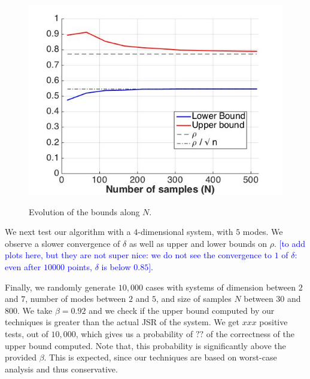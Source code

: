 \begin{figure}
\begin{center}
\includegraphics[scale=0.35]{bounds1.jpg}
\label{fig:2}
\caption{Evolution of the bounds along $N$.}
\end{center}
\end{figure}

We next test our algorithm with a $4$-dimensional system, with $5$ modes. We observe a slower convergence of $\delta$ as well as upper and lower bounds on $\rho$.
\textcolor{blue}{[to add plots here, but they are not super nice: we do not see the convergence to $1$ of $\delta$: even after $10 000$ points, $\delta$ is below $0.85$].}

Finally, we randomly generate $10,000$ cases with systems of dimension between $2$ and $7$, number of modes between $2$ and $5$, and size of samples $N$ between $30$ and $800$. We take $\beta = 0.92$ and we check if the upper bound computed by our techniques is greater than the actual JSR of the system. We get $xxx$ positive tests, out of $10,000$, which gives us a probability of $??$ of the correctness of the upper bound computed. Note that, this probability is significantly above the provided $\beta$. This is expected, since our techniques are based on worst-case analysis and thus conservative.



